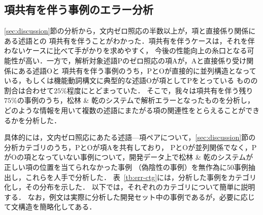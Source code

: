 \documentclass[japanese]{jnlp_1.4}
\begin{document}
\subsection{項共有を伴う事例のエラー分析}
\label{sec:shared-arg-err-analysis}

\ref{sec:discussion}節の分析から，文内ゼロ照応の半数以上が，項と直接係り関係にある述語との
項共有を伴うことがわかった．項共有を伴うケースは，それを伴わないケースに比べて手がかりを求めやすく，
今後の性能向上の糸口となる可能性が高い．一方で，解析対象述語Pのゼロ照応の項Aが，Aと直接係り受け関係にある述語Oと
項共有を伴う事例のうち，PとOが直接的に並列構造となっている，もしくは機能動詞構文に典型的な述語Oが項としてPをとっている
ものの割合は合わせて$25\%$程度にとどまっていた．
そこで，我々は項共有を伴う残り$75\%$の事例のうち，松林 \& 乾のシステムで解析エラーとなったものを分析し，
どのような情報を用いて複数の述語にまたがる項の関連性をとらえることができるかを分析した．

具体的には，文内ゼロ照応にあたる述語—項ペアについて，\ref{sec:discussion}節の分析カテゴリのうち，PとOが項Aを共有しており，
PとOが並列関係でなく，PがOの項となっていない事例について，開発データ上で松林 \& 乾のシステムが正しい項の位置を当てられなかった事例
（偽陰性の事例）を無作為に$50$事例抽出し，これらを人手で分析した．
表~\ref{tb:err-ctg}には，分析した事例をカテゴリ化し，その分布を示した．
以下では，それぞれのカテゴリについて簡単に説明する．
なお，例文は実際に分析した開発セット中の事例であるが，必要に応じて文構造を簡略化してある．

\begin{table}[t]
\label{tb:err-ctg}

\end{table}
\end{document}
